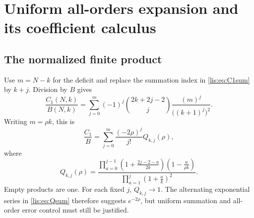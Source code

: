 \documentclass[11pt,letterpaper]{article}
\numberwithin{equation}{section}
\theoremstyle{definition}
\newcommand{\fall}[2]{(#1)^{\underline{#2}}}
\newcommand{\rise}[2]{(#1)^{\overline{#2}}}
\begin{document}
\section{Uniform all-orders expansion and its coefficient calculus}
\label{lis:sec:coefficients}
\subsection{The normalized finite product}
Use $m=N-k$ for the deficit and replace the summation index in
\eqref{lis:eq:C1sum} by $k+j$. Division by $B$ gives
\begin{equation}
 \frac{C_1(N,k)}{B(N,k)}
 =\sum_{j=0}^{m}(-1)^j\binom{2k+2j-2}{j}
                         \frac{\fall{m}{j}}{\bigl(\rise{k+1}{j}\bigr)^2}.
 \label{lis:eq:normalizedsum}
\end{equation}
Writing $m=\rho k$, this is
\begin{equation}
 \frac{C_1}{B}=\sum_{j=0}^{m}\frac{(-2\rho)^j}{j!}
                       Q_{k,j}(\rho),\label{lis:eq:Qsum}
\end{equation}
where
\begin{equation}
 Q_{k,j}(\rho)=
 \frac{\displaystyle\prod_{a=0}^{j-1}
    \left(1+\frac{2j-2-a}{2k}\right)
    \left(1-\frac{a}{\rho k}\right)}
      {\displaystyle\prod_{a=1}^{j}\left(1+\frac ak\right)^2}.
 \label{lis:eq:Qproduct}
\end{equation}
Empty products are one. For each fixed $j$, $Q_{k,j}\to1$.
The alternating exponential series in \eqref{lis:eq:Qsum} therefore
suggests $e^{-2\rho}$, but uniform summation and all-order error
control must still be justified.
\end{document}
